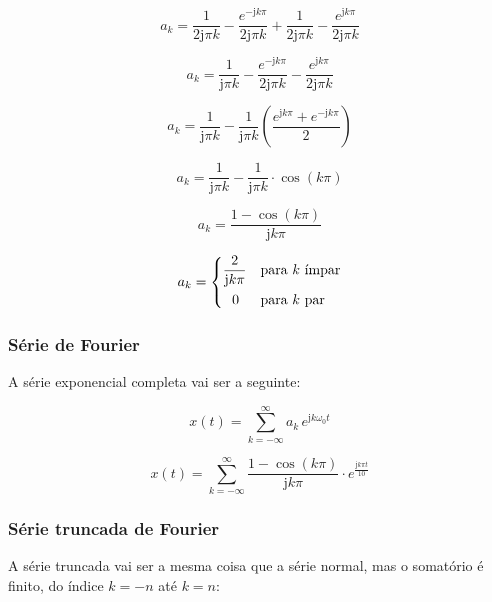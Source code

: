 \documentclass[10pt,twocolumn]{article}
\renewcommand{\j}{\ensuremath{\mathrm{j}}}
\newcommand{\?}{\stackrel{?}{=}}
\begin{document}
\begin{equation*}
	a_k=\frac{1}{2\j\pi k}-\frac{e^{-\j k\pi}}{2\j\pi k}+\frac{1}{2\j\pi k}-\frac{e^{\j k\pi}}{2\j\pi k}
\end{equation*}

\begin{equation*}
	a_k=\frac{1}{\j\pi k}-\frac{e^{-\j k\pi}}{2\j\pi k}-\frac{e^{\j k\pi}}{2\j\pi k}
\end{equation*}

\begin{equation*}
	a_k=\frac{1}{\j\pi k}-\frac{1}{\j\pi k}\left(\frac{e^{\j k\pi}+e^{-\j k\pi}}{2}\right)
\end{equation*}

\begin{equation*}
	a_k=\frac{1}{\j\pi k}-\frac{1}{\j\pi k}\cdot\cos(k\pi)
\end{equation*}

\begin{equation*}
	a_k=\frac{1-\cos(k\pi)}{\j k\pi}
\end{equation*}

\begin{equation*}
	a_k=\begin{dcases}
		\frac{2}{\j k\pi}&\text{para }k\text{ ímpar}\\
		\;\:\,0&\text{para }k\text{ par}
	\end{dcases}
\end{equation*}

\subsubsection{Série de Fourier}

A série exponencial completa vai ser a seguinte:

\begin{equation*}
	x(t)=\sum_{k=-\infty}^{\infty}a_k\,e^{\j k\omega_0t}
\end{equation*}

\begin{equation*}
	x(t)=\sum_{k=-\infty}^{\infty}\frac{1-\cos(k\pi)}{\j k\pi}\cdot e^{\frac{\j k\pi t}{10}}
\end{equation*}

\subsubsection{Série truncada de Fourier}

A série truncada vai ser a mesma coisa que a série normal, mas o somatório é finito, do índice $k=-n$ até $k=n$:
\end{document}

